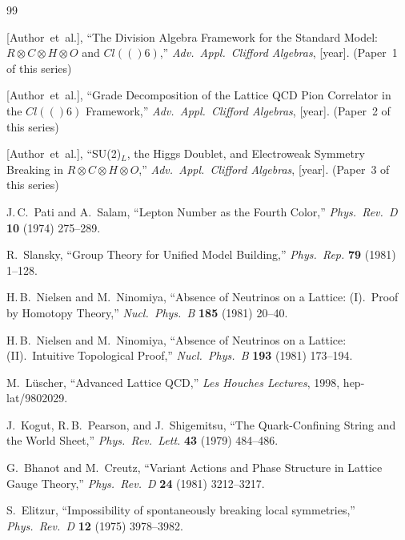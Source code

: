 \documentclass[12pt,a4paper]{article}
\newcommand{\Cl}{\mathrm{Cl}}
\newcommand{\HH}{\mathbb{H}}
\newcommand{\RR}{\mathbb{R}}
\newcommand{\CC}{\mathbb{C}}
\newcommand{\OO}{\mathbb{O}}
\def\Cl#1{Cl(#1)}%
\def\HH{H}%
\def\RR{R}%
\def\CC{C}%
\def\OO{O}%
\def\mathbb#1{#1}%
\def\mathrm#1{#1}%
\begin{document}
	\begin{thebibliography}{99}
		
		[Author~et~al.], ``The Division Algebra Framework for the Standard Model:
		$\RR\otimes\CC\otimes\HH\otimes\OO$ and $\Cl(6)$,''
		\textit{Adv.\ Appl.\ Clifford Algebras}, [year].
		(Paper~1 of this series)
		
		[Author~et~al.], ``Grade Decomposition of the Lattice QCD Pion Correlator
		in the $\Cl(6)$ Framework,''
		\textit{Adv.\ Appl.\ Clifford Algebras}, [year].
		(Paper~2 of this series)
		
		[Author~et~al.], ``SU(2)$_L$, the Higgs Doublet, and Electroweak Symmetry
		Breaking in $\RR\otimes\CC\otimes\HH\otimes\OO$,''
		\textit{Adv.\ Appl.\ Clifford Algebras}, [year].
		(Paper~3 of this series)
		
		J.\,C.~Pati and A.~Salam,
		``Lepton Number as the Fourth Color,''
		\textit{Phys.\ Rev.\ D} \textbf{10} (1974) 275--289.
		
		R.~Slansky,
		``Group Theory for Unified Model Building,''
		\textit{Phys.\ Rep.} \textbf{79} (1981) 1--128.
		
		H.\,B.~Nielsen and M.~Ninomiya,
		``Absence of Neutrinos on a Lattice: (I).\ Proof by Homotopy Theory,''
		\textit{Nucl.\ Phys.\ B} \textbf{185} (1981) 20--40.
		
		H.\,B.~Nielsen and M.~Ninomiya,
		``Absence of Neutrinos on a Lattice: (II).\ Intuitive Topological Proof,''
		\textit{Nucl.\ Phys.\ B} \textbf{193} (1981) 173--194.
		
		M.~L\"uscher,
		``Advanced Lattice QCD,''
		\textit{Les Houches Lectures}, 1998, hep-lat/9802029.
		
		J.~Kogut, R.\,B.~Pearson, and J.~Shigemitsu,
		``The Quark-Confining String and the World Sheet,''
		\textit{Phys.\ Rev.\ Lett.} \textbf{43} (1979) 484--486.
		
		G.~Bhanot and M.~Creutz,
		``Variant Actions and Phase Structure in Lattice Gauge Theory,''
		\textit{Phys.\ Rev.\ D} \textbf{24} (1981) 3212--3217.
		
		S.~Elitzur,
		``Impossibility of spontaneously breaking local symmetries,''
		\textit{Phys.\ Rev.\ D} \textbf{12} (1975) 3978--3982.
		
	\end{thebibliography}
	
\end{document}
